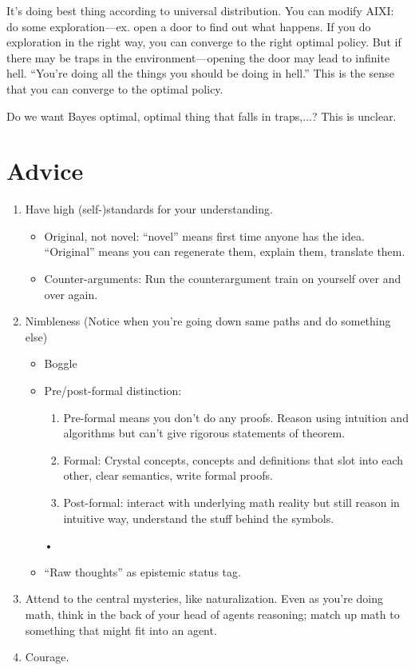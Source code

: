 \documentclass[11pt]{article}
\begin{document}
It's doing best thing according to universal distribution. You can modify AIXI: do some exploration---ex. open a door to find out what happens. If you do exploration in the right way, you can converge to the right optimal policy. %
But if there may be traps in the environment---opening the door may lead to infinite hell. ``You're doing all the things you should be doing in hell.'' This is the sense that you can converge to the optimal policy.

Do we want Bayes optimal, optimal thing that falls in traps,...? This is unclear.





\section{Advice}

\begin{enumerate}
\item
Have high (self-)standards for your understanding.
\begin{itemize}
\item
Original, not novel: ``novel'' means first time anyone has the idea. ``Original'' means you can regenerate them, explain them, translate them.
\item
Counter-arguments: Run the counterargument train on yourself over and over again.
\end{itemize}
\item
Nimbleness  (Notice when you're going down same paths and do something else)
\begin{itemize}
\item
Boggle
\item
Pre/post-formal distinction: 
\begin{enumerate}
\item
Pre-formal means you don't do any proofs. Reason using intuition and algorithms but can't give rigorous statements of theorem. 
\item
Formal: Crystal concepts, concepts and definitions that slot into each other, clear semantics, write formal proofs. 
\item 
Post-formal: interact with underlying math reality but still reason in intuitive way, understand the stuff behind the symbols. 
\end{enumerate}•
\item ``Raw thoughts'' as epistemic status tag.
\end{itemize}
\item
Attend to the central mysteries, like naturalization.
Even as you're doing math, think in the back of your head of agents reasoning; match up math to something that might fit into an agent.
\item
Courage.
\end{enumerate}
\end{document}
